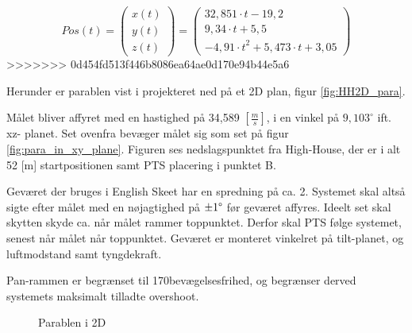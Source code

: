 
\begin{equation}
Pos\left( t \right) = 
\left( \begin{matrix} 
	x\left( t \right)  \\ 
	y\left( t \right)  \\ 
	z\left( t \right)  \end{matrix} \right) =	\left( \begin{matrix}
	32,851\cdot t-19,2 \\
	9,34\cdot t+5,5 \\
	-{ 4,91\cdot t }^{ 2 }+5,473\cdot t+3,05 
 \end{matrix} \right) 
\label{eq:pf:vektorparabel3d}
\end{equation}
>>>>>>> 0d454fd513f446b8086ea64ae0d170e94b44e5a6

Herunder er parablen vist i projekteret ned på et 
2D plan, figur \ref{fig:HH2D_para}.

Målet bliver affyret med en hastighed på 34,589 \([\frac{m}{s}]\), i en vinkel på \(9,103^{\circ}\) ift. xz-
planet. Set ovenfra bevæger målet sig som set på figur \ref{fig:para_in_xy_plane}. 
Figuren ses nedslagspunktet fra High-House, der er i alt 52 [m] startpositionen samt 
PTS placering i punktet B. 

Geværet der bruges i English Skeet har en spredning på ca. 2\degree . Systemet skal altså sigte efter målet med en nøjagtighed på $\pm 1 \degree$ før geværet affyres.
Ideelt set skal skytten skyde ca. når målet rammer toppunktet. 
Derfor skal PTS følge systemet, senest når målet når toppunktet. 
Geværet er monteret vinkelret på tilt-planet, og luftmodstand samt tyngdekraft.

Pan-rammen er begrænset til 170\degree   bevægelsesfrihed, og begrænser derved systemets maksimalt tilladte overshoot.
%
%




\begin{figure}[h!]
\centering
%
\caption[Målets parabel i 2 dimensioner]{Parablen i 2D}
\end{figure}



